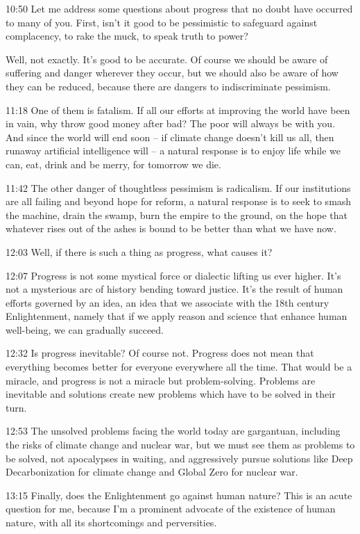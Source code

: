 \documentclass[10pt,titlepage]{article}
\begin{document}
10:50
Let me address some questions about progress
that no doubt have occurred to many of you.
First, isn't it good to be pessimistic
to safeguard against complacency,
to rake the muck, to speak truth to power?

Well, not exactly.
It's good to be accurate.
Of course we should be aware of suffering and danger
wherever they occur,
but we should also be aware of how they can be reduced,
because there are dangers to indiscriminate pessimism.

11:18
One of them is fatalism.
If all our efforts at improving the world
have been in vain,
why throw good money after bad?
The poor will always be with you.
And since the world will end soon --
if climate change doesn't kill us all,
then runaway artificial intelligence will --
a natural response is to enjoy life while we can,
eat, drink and be merry, for tomorrow we die.

11:42
The other danger of thoughtless pessimism is radicalism.
If our institutions are all failing and beyond hope for reform,
a natural response is to seek to smash the machine,
drain the swamp,
burn the empire to the ground,
on the hope that whatever rises out of the ashes
is bound to be better than what we have now.

12:03
Well, if there is such a thing as progress,
what causes it?

12:07
Progress is not some mystical force or dialectic lifting us ever higher.
It's not a mysterious arc of history bending toward justice.
It's the result of human efforts governed by an idea,
an idea that we associate with the 18th century Enlightenment,
namely that if we apply reason and science
that enhance human well-being,
we can gradually succeed.

12:32
Is progress inevitable? Of course not.
Progress does not mean that everything becomes better
for everyone everywhere all the time.
That would be a miracle, and progress is not a miracle
but problem-solving.
Problems are inevitable
and solutions create new problems which have to be solved in their turn.

12:53
The unsolved problems facing the world today are gargantuan,
including the risks of climate change
and nuclear war,
but we must see them as problems to be solved,
not apocalypses in waiting,
and aggressively pursue solutions
like Deep Decarbonization for climate change
and Global Zero for nuclear war.

13:15
Finally, does the Enlightenment go against human nature?
This is an acute question for me,
because I'm a prominent advocate of the existence of human nature,
with all its shortcomings and perversities.
\end{document}
